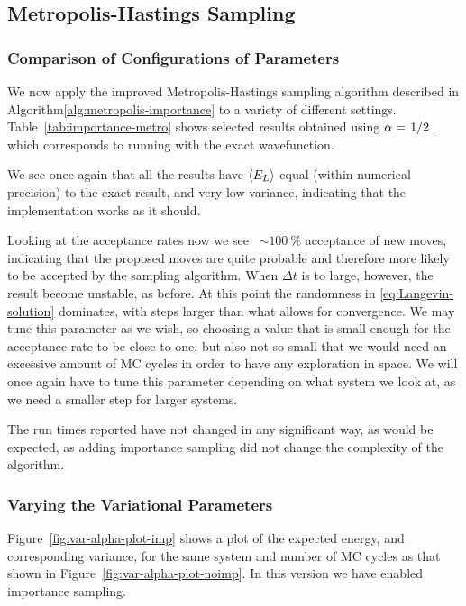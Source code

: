 \documentclass[a4paper, 11pt]{article}
\begin{document}
\begin{multicols}{2}




\subsection{Metropolis-Hastings Sampling}
\subsubsection{Comparison of Configurations of Parameters}

We now apply the improved Metropolis-Hastings sampling algorithm described in 
Algorithm\ref{alg:metropolis-importance} to a variety of different settings.
Table~\ref{tab:importance-metro} shows selected results obtained using
$\alpha=\flatfrac{1}{2}$, which corresponds to running with the exact
wavefunction. 

We see once again that all the results have $\expval{E_L}$
equal (within numerical precision) to the exact result, and very low variance,
indicating that the implementation works as it should.

Looking at the acceptance rates now we see ~$\sim\SI{100}{\percent}$ acceptance
of new moves, indicating that the proposed moves are quite probable and
therefore more likely to be accepted by the sampling algorithm. When $\Delta t$
is to large, however, the result become unstable, as before. At this point the
randomness in \eqref{eq:Langevin-solution} dominates, with steps larger than
what allows for convergence. We may tune this parameter as we wish, so choosing
a value that is small enough for the acceptance rate to be close to one, but
also not so small that we would need an excessive amount of MC cycles in order
to have any exploration in space. We will once again have to tune this parameter
depending on what system we look at, as we need a smaller step for larger
systems.

The run times reported have not changed in any significant way, as would be
expected, as adding importance sampling did not change the complexity of the algorithm.


\subsubsection{Varying the Variational Parameters}
Figure~\ref{fig:var-alpha-plot-imp} shows a plot of the expected energy, and
corresponding variance, for the same system and number of MC cycles as that
shown in Figure~\ref{fig:var-alpha-plot-noimp}. In this version we have enabled
importance sampling.


\end{multicols}
\end{document}
